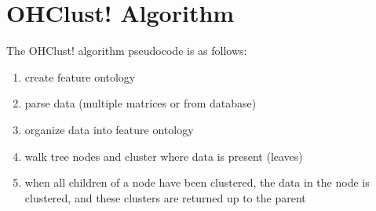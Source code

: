 \documentclass[12pt]{ucthesis}
\begin{document}
   \section{OHClust! Algorithm}\label{sec:ohclust}
      The OHClust! algorithm pseudocode is as follows:
         \begin{enumerate}
            \item create feature ontology
            \item parse data (multiple matrices or from database)
            \item organize data into feature ontology
            \item walk tree nodes and cluster where data is present (leaves)
            \item when all children of a node have been clustered, the data in the
                  node is clustered, and these clusters are returned up to the
                  parent
         \end{enumerate}
\end{document}
